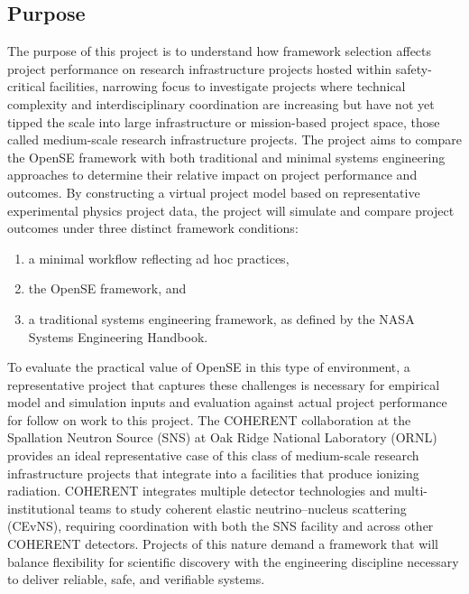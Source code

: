 \subsection{Purpose}
\label{sub:purpose}
The purpose of this project is to understand how framework selection affects project performance on research infrastructure projects hosted within safety-critical facilities, narrowing focus to investigate projects where technical complexity and interdisciplinary coordination are increasing but have not yet tipped the scale into large infrastructure or mission-based project space, those called medium-scale research infrastructure projects.
The project aims to compare the OpenSE framework with both traditional and minimal systems engineering approaches to determine their relative impact on project performance and outcomes.
By constructing a virtual project model based on representative experimental physics project data, the project will simulate and compare project outcomes under three distinct framework conditions:
\begin{enumerate}[noitemsep, topsep=0pt]
    \item a minimal workflow reflecting ad hoc practices,
    \item the OpenSE framework, and
    \item a traditional systems engineering framework, as defined by the NASA Systems Engineering Handbook.
\end{enumerate}
To evaluate the practical value of OpenSE in this type of environment, a representative project that captures these challenges is necessary for empirical model and simulation inputs and evaluation against actual project performance for follow on work to this project. 
The COHERENT collaboration at the Spallation Neutron Source (SNS) at Oak Ridge National Laboratory (ORNL) provides an ideal representative case of this class of medium-scale research infrastructure projects that integrate into a facilities that produce ionizing radiation. 
COHERENT integrates multiple detector technologies and multi-institutional teams to study coherent elastic neutrino–nucleus scattering (CEvNS)\cite{ornlCoherent}, requiring coordination with both the SNS facility and across other COHERENT detectors. 
Projects of this nature demand a framework that will balance flexibility for scientific discovery with the engineering discipline necessary to deliver reliable, safe, and verifiable systems.
